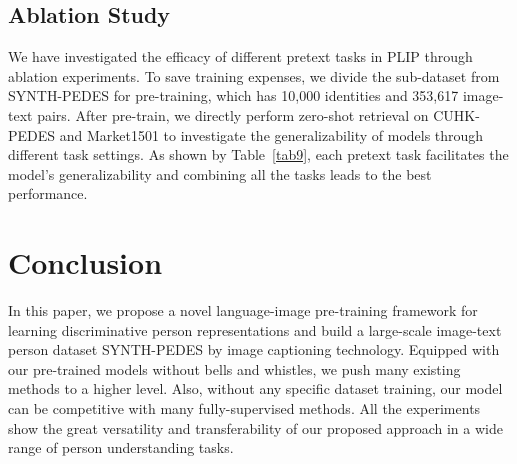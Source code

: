 \documentclass[10pt,twocolumn,letterpaper]{article}
\begin{document}
\subsection{Ablation Study}
 We have investigated the efficacy of different pretext tasks in PLIP through ablation experiments. To save training expenses, we divide the sub-dataset from SYNTH-PEDES for pre-training, which has 10,000 identities and 353,617 image-text pairs. After pre-train, we directly perform zero-shot retrieval on CUHK-PEDES and Market1501 to investigate the generalizability of models through different task settings. As shown by Table~\ref{tab9}, each pretext task facilitates the model’s generalizability and combining all the tasks leads to the best performance.
\begin{table}[t]
\Large
\centering
\caption{Ablation study of PLIP by zero-shot retrieval.}
\label{tab9}
\end{table}

\section{Conclusion}
In this paper, we propose a novel language-image pre-training framework for learning discriminative person representations and build a large-scale image-text person dataset SYNTH-PEDES by image captioning technology. Equipped with our pre-trained models without bells and whistles, we push many existing methods to a higher level. Also, without any specific dataset training, our model can be competitive with many fully-supervised methods. All the experiments show the great versatility and transferability of our proposed approach in a wide range of person understanding tasks.
\end{document}
